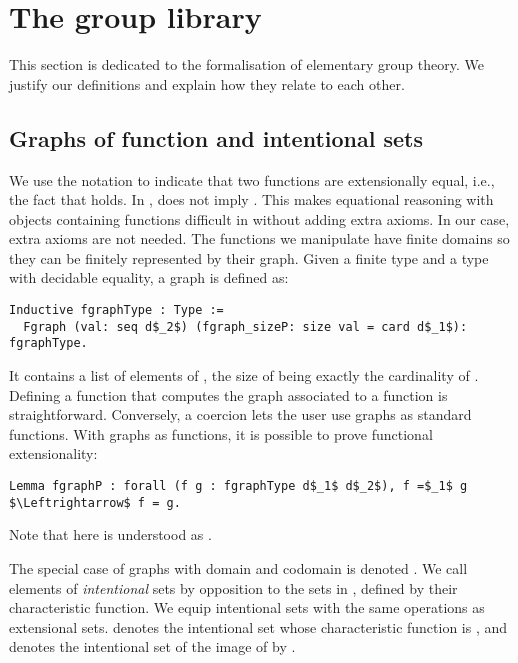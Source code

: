 \section{The group library}

This section is dedicated to the formalisation of elementary group
theory. We justify our definitions and explain how they relate to each other.

\subsection{Graphs of function and intentional sets}
We use the notation  to indicate that
two functions are extensionally equal, i.e.,  the fact that
 holds. In \Coq, 
does not imply . This makes equational reasoning
with objects containing functions difficult in \Coq{}
without adding extra axioms. In our case, extra axioms are not needed.
The functions we manipulate have finite domains so they can be finitely
represented by their graph. Given  a finite type and 
a type with decidable equality, a graph is defined as:

\begin{lstlisting}
Inductive fgraphType : Type := 
  Fgraph (val: seq d$_2$) (fgraph_sizeP: size val = card d$_1$): fgraphType.
\end{lstlisting}
It contains a list  of elements of , the size of  being
exactly the cardinality of . Defining
a function  that computes the graph associated to a function
is straightforward.
Conversely, a coercion  lets the user use graphs
as standard functions.
With graphs as functions, it is possible to prove functional extensionality:
\begin{lstlisting}
Lemma fgraphP : forall (f g : fgraphType d$_1$ d$_2$), f =$_1$ g $\Leftrightarrow$ f = g.
\end{lstlisting} 
Note that here  is
understood as .

The special case of graphs with domain  and codomain  is
denoted \mbox{}.
We call elements of  \emph{intentional} sets by
opposition to the sets in ,
defined by their characteristic function.
We equip intentional sets with the same operations as extensional sets.
 denotes the intentional set whose
characteristic function is , and  denotes
the intentional set of the image of  by .

